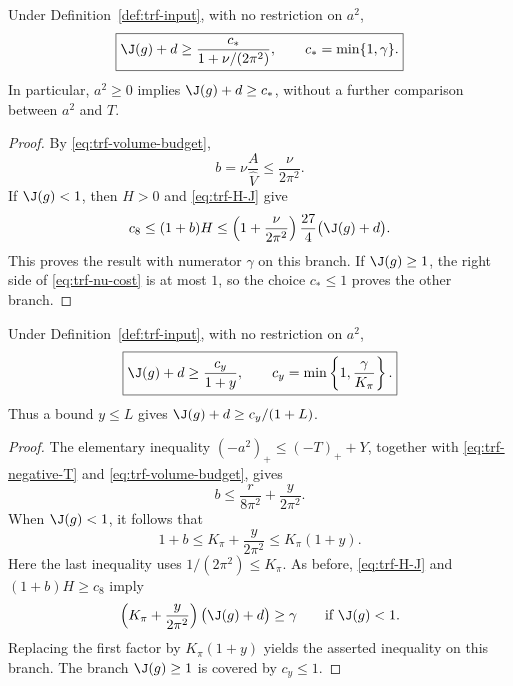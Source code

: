 \begin{corollary}
\label{cor:trf-nu}
Under Definition~\ref{def:trf-input}, with no restriction on $a^2$,
\begin{equation}
 \boxed{\J(g)+d\ge\frac{c_*}{1+\nu/(2\pi^2)},
 \qquad c_*=\min\{1,\gamma\}.}
 \label{eq:trf-nu-cost}
\end{equation}
In particular, $a^2\ge0$ implies $\J(g)+d\ge c_*$, without a
further comparison between $a^2$ and $T$.
\end{corollary}

\begin{proof}
By \eqref{eq:trf-volume-budget},
\[
 b=\nu\frac{A}{\widehat V}\le\frac{\nu}{2\pi^2}.
\]
If $\J(g)<1$, then $H>0$ and \eqref{eq:trf-H-J} give
\[
 c_8\le(1+b)H
 \le\left(1+\frac{\nu}{2\pi^2}\right)
       \frac{27}{4}\bigl(\J(g)+d\bigr).
\]
This proves the result with numerator $\gamma$ on this branch.  If
$\J(g)\ge1$, the right side of \eqref{eq:trf-nu-cost} is at most
$1$, so the choice $c_*\le1$ proves the other branch.
\end{proof}

\begin{corollary}
\label{cor:trf-y}
Under Definition~\ref{def:trf-input}, with no restriction on $a^2$,
\begin{equation}
 \boxed{\J(g)+d\ge\frac{c_y}{1+y},
 \qquad c_y=\min\left\{1,\frac{\gamma}{K_\pi}\right\}.}
 \label{eq:trf-y-cost}
\end{equation}
Thus a bound $y\le L$ gives $\J(g)+d\ge c_y/(1+L)$.
\end{corollary}

\begin{proof}
The elementary inequality $(-a^2)_+\le(-T)_++Y$, together with
\eqref{eq:trf-negative-T} and \eqref{eq:trf-volume-budget}, gives
\[
 b\le\frac{r}{8\pi^2}+\frac{y}{2\pi^2}.
\]
When $\J(g)<1$, it follows that
\[
 1+b\le K_\pi+\frac{y}{2\pi^2}\le K_\pi(1+y).
\]
Here the last inequality uses $1/(2\pi^2)\le K_\pi$.  As before,
\eqref{eq:trf-H-J} and $(1+b)H\ge c_8$ imply
\begin{equation}
 \left(K_\pi+\frac{y}{2\pi^2}\right)
          \bigl(\J(g)+d\bigr)\ge\gamma
 \qquad\text{if }\J(g)<1.
 \label{eq:trf-y-refined-branch}
\end{equation}
Replacing the first factor by $K_\pi(1+y)$ yields the asserted
inequality on this branch.  The branch $\J(g)\ge1$ is covered by
$c_y\le1$.
\end{proof}

